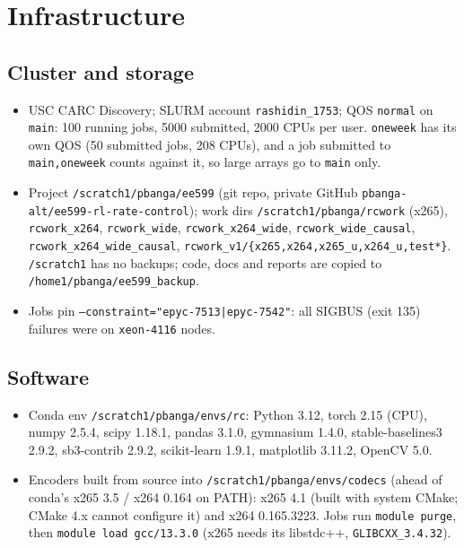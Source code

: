 \documentclass[10pt,a4paper]{article}
\newcommand{\code}[1]{\texttt{\small #1}}
\begin{document}
\section{Infrastructure}
\subsection{Cluster and storage}
\begin{itemize}
\item USC CARC Discovery; SLURM account \code{rashidin\_1753}; QOS \code{normal} on \code{main}: 100 running jobs, 5000
submitted, 2000 CPUs per user. \code{oneweek} has its own QOS (50 submitted jobs, 208 CPUs), and a job submitted to
\code{main,oneweek} counts against it, so large arrays go to \code{main} only.
\item Project \code{/scratch1/pbanga/ee599} (git repo, private GitHub \code{pbanga-alt/ee599-rl-rate-control});
work dirs \code{/scratch1/pbanga/rcwork} (x265), \code{rcwork\_x264}, \code{rcwork\_wide}, \code{rcwork\_x264\_wide},
\code{rcwork\_wide\_causal}, \code{rcwork\_x264\_wide\_causal}, \code{rcwork\_v1/\{x265,x264,x265\_u,x264\_u,test*\}}.
\code{/scratch1} has no backups; code, docs and reports are copied to \code{/home1/pbanga/ee599\_backup}.
\item Jobs pin \code{--constraint="epyc-7513|epyc-7542"}: all SIGBUS (exit 135) failures were on \code{xeon-4116} nodes.
\end{itemize}
\subsection{Software}
\begin{itemize}
\item Conda env \code{/scratch1/pbanga/envs/rc}: Python 3.12, torch 2.15 (CPU), numpy 2.5.4, scipy 1.18.1, pandas
3.1.0, gymnasium 1.4.0, stable-baselines3 2.9.2, sb3-contrib 2.9.2, scikit-learn 1.9.1, matplotlib 3.11.2, OpenCV 5.0.
\item Encoders built from source into \code{/scratch1/pbanga/envs/codecs} (ahead of conda's x265 3.5 / x264 0.164 on
PATH): x265 4.1 (built with system CMake; CMake 4.x cannot configure it) and x264 0.165.3223. Jobs run
\code{module purge}, then \code{module load gcc/13.3.0} (x265 needs its libstdc++, \code{GLIBCXX\_3.4.32}).
\end{itemize}
\end{document}
